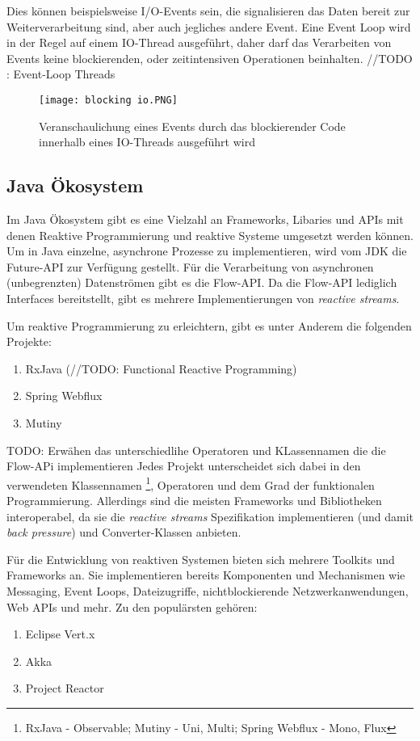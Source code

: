 Dies können beispielsweise I/O-Events sein, die signalisieren das Daten bereit zur Weiterverarbeitung sind, aber auch jegliches andere Event.
Eine Event Loop wird in der Regel auf einem IO-Thread ausgeführt, daher darf das Verarbeiten von Events
keine blockierenden, oder zeitintensiven Operationen beinhalten\parencite{Ponge2020}.
//TODO : Event-Loop Threads
\begin{figure}[h!]
	\centering
	\texttt{[image: blocking io.PNG]}
	\caption{Veranschaulichung eines Events durch das blockierender Code innerhalb eines IO-Threads ausgeführt wird
		\parencite[Kapitel 17,  Figure 17.2]{JavaInAction}}
	\label{fig:blocking}
\end{figure}

\subsection{Java Ökosystem}
\label{section:java_tooling}
Im Java Ökosystem gibt es eine Vielzahl an Frameworks, Libaries und APIs mit denen Reaktive Programmierung und reaktive Systeme umgesetzt
werden können.
Um in Java einzelne, asynchrone Prozesse zu implementieren, wird vom JDK die Future-API zur Verfügung gestellt.\parencite{OracleFuture}
Für die Verarbeitung von asynchronen (unbegrenzten) Datenströmen gibt es die Flow-API.\parencite{OracleFlow}
Da die Flow-API lediglich Interfaces bereitstellt, gibt es mehrere Implementierungen von \textit{reactive streams}.

Um reaktive Programmierung zu erleichtern, gibt es unter Anderem die folgenden Projekte:
\begin{enumerate}
	\item RxJava (//TODO: Functional Reactive Programming)
	\item Spring Webflux
	\item Mutiny
\end{enumerate}
TODO: Erwähen das unterschiedlihe Operatoren und KLassennamen die die Flow-APi implementieren
Jedes Projekt unterscheidet sich dabei in den verwendeten Klassennamen \footnote{RxJava - Observable; Mutiny - Uni, Multi; Spring Webflux - Mono, Flux},
Operatoren und dem Grad der funktionalen Programmierung.\parencite{ReactiveX, Mutiny}
Allerdings sind die meisten Frameworks und Bibliotheken interoperabel, da sie die \textit{reactive streams} Spezifikation implementieren (und damit
\textit{back pressure}) und Converter-Klassen anbieten.

Für die Entwicklung von reaktiven Systemen bieten sich mehrere Toolkits und Frameworks an.
Sie implementieren bereits Komponenten und Mechanismen wie Messaging, Event Loops, Dateizugriffe, nichtblockierende Netzwerkanwendungen, Web APIs und mehr.
Zu den populärsten gehören:
\begin{enumerate}
	\item Eclipse Vert.x
	\item Akka
	\item Project Reactor
\end{enumerate}\parencite{Vert.x, Akka, ProjectReactor}


